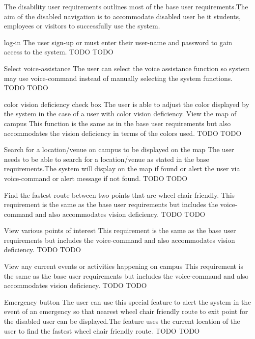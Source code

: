 The disability user requirements outlines most of the base user requirements.The aim of the disabled navigation is to accommodate disabled user be it students, employees or visitors to successfully use the system.

\FuncReq 
{log-in }
{The user sign-up or must enter their user-name and password to gain access to the system. }
 {TODO}
 {TODO}

\FuncReq
{Select voice-assistance }
{The user can select the voice assistance function so system may use voice-command instead of manually selecting the system functions.}
{TODO}
{TODO}

\FuncReq
{ color vision deficiency check box}
{The user is able to adjust the color displayed by the system in the case of a user with color vision deficiency.}
\FuncReq
{View the map of campus}
{This function is the same as in the base user requirements but also accommodates the vision deficiency in terms of the colors used.}
{TODO}
{TODO}

\FuncReq
{Search for a location/venue on campus to be displayed on the map}
{The user needs to be able to search for a location/venue as stated in the base requirements.The system will display on the map if found or alert the user via voice-command or alert message if not found.}
{TODO}
{TODO}

\FuncReq
{Find the fastest route between two points that are wheel chair friendly.}%
{ This requirement is the same as the base user requirements but includes the voice-command and also accommodates vision deficiency.}
{TODO}
{TODO}

\FuncReq
{View various points of interest}
{This requirement is the same as the base user requirements but includes the voice-command and also accommodates vision deficiency.}
{TODO}
{TODO}

\FuncReq
{View any current events or activities happening on campus}
{This requirement is the same as the base user requirements but includes the voice-command and also accommodates vision deficiency.}
{TODO}
{TODO}

\FuncReq
{Emergency button }
{The user can use this special feature to alert the system in the event of an emergency so that nearest wheel chair friendly route to exit point for the disabled user can be displayed.The feature uses the current location of the user to find the fastest wheel chair friendly route.}
{TODO}
{TODO}
